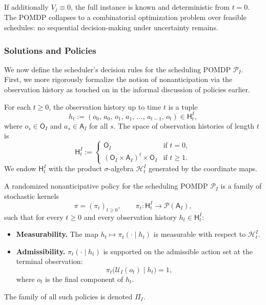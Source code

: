 \begin{remark}
If additionally $V_j \equiv 0$, the full instance is known and deterministic from
$t = 0$. The POMDP collapses to a combinatorial optimization problem over feasible
schedules: no sequential decision-making under uncertainty remains.
\end{remark}

\subsubsection{Solutions and Policies}

We now define the scheduler's decision rules for the scheduling POMDP
$\mathcal{P}_I$. First, we more rigorously formalize the notion of nonanticipation via the observation history as touched on in the informal discussion of policies earlier.

\begin{definition}\label{def:obshist}
For each $t \ge 0$, the observation history up to time $t$ is a tuple
\[
h_t := (o_0,\, a_0,\, o_1,\, a_1,\, \ldots,\, a_{t-1},\, o_t)
\in \mathsf{H}_t^I,
\]
where $o_s \in \mathsf{O}_I$ and $a_s \in \mathsf{A}_I$ for all $s$. The space of
observation histories of length $t$ is
\[
\mathsf{H}_t^I := \begin{cases} \mathsf{O}_I & \text{if } t = 0, \\
(\mathsf{O}_I \times \mathsf{A}_I)^{t} \times \mathsf{O}_I & \text{if } t \ge 1.
\end{cases}
\]
We endow $\mathsf{H}_t^I$ with the product $\sigma$-algebra $\mathcal{H}_t^I$
generated by the coordinate maps.
\end{definition}

\begin{definition}\label{def:randpolicy}
A randomized nonanticipative policy for the scheduling POMDP $\mathcal{P}_I$
is a family of stochastic kernels
\[
\pi = (\pi_t)_{t \ge 0}, \qquad
\pi_t : \mathsf{H}_t^I \to \mathcal{P}(\mathsf{A}_I),
\]
such that for every $t \ge 0$ and every observation history $h_t \in \mathsf{H}_t^I$:
\begin{itemize}
    \item[\textbf{(P1)}] \textbf{Measurability.} The map
    $h_t \mapsto \pi_t(\cdot \mid h_t)$ is measurable with respect to
    $\mathcal{H}_t^I$.
    \item[\textbf{(P2)}] \textbf{Admissibility.} $\pi_t(\cdot \mid h_t)$ is supported
    on the admissible action set at the terminal observation:
    \[
    \pi_t\bigl(\mathcal{U}_I(o_t) \;\big|\; h_t\bigr) = 1,
    \]
    where $o_t$ is the final component of $h_t$.
\end{itemize}
The family of all such policies is denoted $\Pi_I$.
\end{definition}

